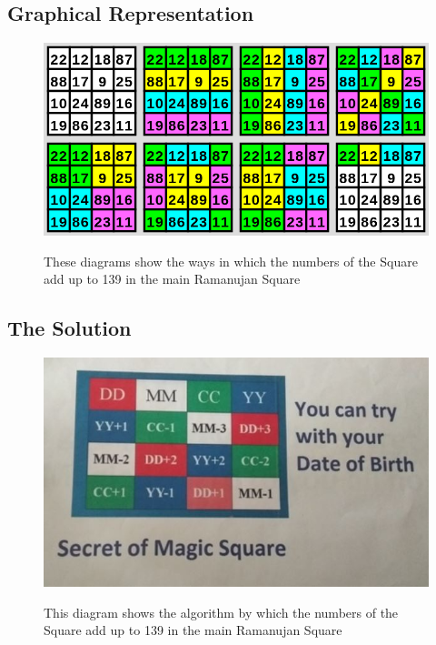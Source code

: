 \documentclass{article}
\begin{document}
\subsection{Graphical Representation}
\begin{figure}[H]
\begin{center}
\includegraphics[scale = 0.4]{MagicSquare} 
\cite{magicSquare}
\caption{These diagrams show the ways in which the numbers of the Square add up to 139 in the main Ramanujan Square}
\end{center}
\end{figure}

\newpage
\subsection{The Solution}
\begin{figure}[H]
\begin{center}
\includegraphics[scale = 1.0]{RamanujanSquare}
\cite{ramanujanSquare}
\caption{This diagram shows the algorithm by which the numbers of the Square add up to 139 in the main Ramanujan Square}
\end{center}
\end{figure}
\end{document}
